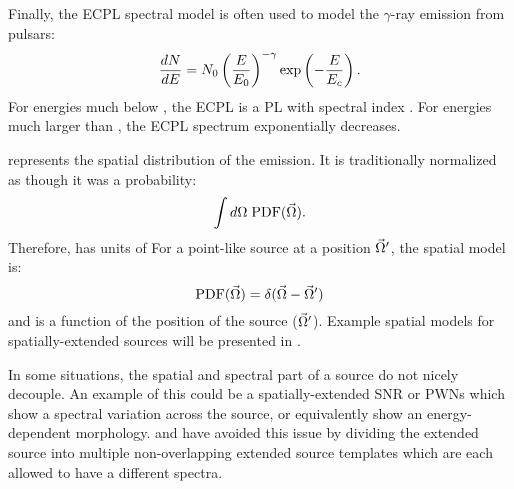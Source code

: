 Finally, the \ac{ECPL} spectral model is often used to model the
$\gamma$-ray emission from pulsars:
\begin{equation}
  \frac{dN}{dE} = N_0 \left(\frac{E}{E_0}\right)^{-\gamma}
  \exp\left(-\frac{E}{E_c}\right).
\end{equation}
For energies much below \Ecutoff, the \ac{ECPL} is a \ac{PL} with
spectral index \spectralindex.  For energies much larger than \Ecutoff,
the \ac{ECPL} spectrum exponentially decreases.

\pdf represents the spatial distribution of the emission.  It is
traditionally normalized as though it was a probability:
\begin{equation}
  \int d\Omega \; \text{PDF}(\vec\Omega).
\end{equation}
Therefore, \pdf has units of \pdfunits For a point-like source at a
position $\vec\Omega'$, the spatial model is:
\begin{equation}
  \text{PDF}(\vec\Omega) = \delta(\vec\Omega - \vec\Omega')
\end{equation}
and is a function of the position of the source ($\vec\Omega'$).
Example spatial models for spatially-extended sources will be presented
in .

In some situations, the spatial and spectral part of a source do not
nicely decouple.  An example of this could be a spatially-extended
\acs{SNR} or \acp{PWN} which show a spectral variation
across the source, or equivalently show an energy-dependent
morphology.  \cite{katsuta_2012_fermi-lat-observation} and
\cite{hewitt_2012_fermi-lat-observations} have avoided this issue by
dividing the extended source into multiple non-overlapping extended
source templates which are each allowed to have a different spectra.

